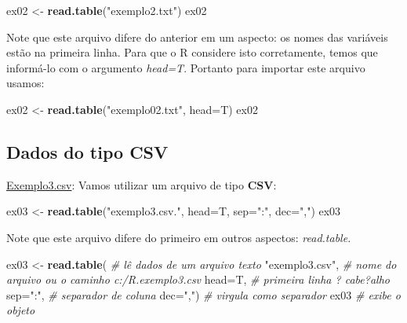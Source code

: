 \documentclass[
]{book}
\newenvironment{Shaded}{\begin{snugshade}}{\end{snugshade}}
\newcommand{\CommentTok}[1]{\textcolor[rgb]{0.56,0.35,0.01}{\textit{#1}}}
\newcommand{\DataTypeTok}[1]{\textcolor[rgb]{0.13,0.29,0.53}{#1}}
\newcommand{\KeywordTok}[1]{\textcolor[rgb]{0.13,0.29,0.53}{\textbf{#1}}}
\newcommand{\NormalTok}[1]{#1}
\newcommand{\StringTok}[1]{\textcolor[rgb]{0.31,0.60,0.02}{#1}}
\begin{document}
\begin{Shaded}
\begin{Highlighting}[]
\NormalTok{ex02 <-}\StringTok{ }\KeywordTok{read.table}\NormalTok{(}\StringTok{"exemplo2.txt"}\NormalTok{) }
\NormalTok{ex02}
\end{Highlighting}
\end{Shaded}

Note que este arquivo difere do anterior em um aspecto: os nomes das variáveis estão na primeira linha. Para que o R considere isto corretamente, temos que informá-lo com o argumento \emph{head=T}. Portanto para importar este arquivo usamos:

\begin{Shaded}
\begin{Highlighting}[]
\NormalTok{ex02 <-}\StringTok{ }\KeywordTok{read.table}\NormalTok{(}\StringTok{"exemplo02.txt"}\NormalTok{, }\DataTypeTok{head=}\NormalTok{T) }
\NormalTok{ex02}
\end{Highlighting}
\end{Shaded}

\hypertarget{dados-do-tipo-csv}{%
\subsection{Dados do tipo CSV}\label{dados-do-tipo-csv}}

\href{https://www.dropbox.com/s/mv13cmkysw2nizm/exemplo3.csv?dl=1}{Exemplo3.csv}: Vamos utilizar um arquivo de tipo \textbf{CSV}:

\begin{Shaded}
\begin{Highlighting}[]
\NormalTok{ex03 <-}\StringTok{ }\KeywordTok{read.table}\NormalTok{(}\StringTok{"exemplo3.csv."}\NormalTok{, }\DataTypeTok{head=}\NormalTok{T, }\DataTypeTok{sep=}\StringTok{":"}\NormalTok{, }\DataTypeTok{dec=}\StringTok{","}\NormalTok{) }
\NormalTok{ex03}
\end{Highlighting}
\end{Shaded}

Note que este arquivo difere do primeiro em outros aspectos:
\emph{read.table.}

\begin{Shaded}
\begin{Highlighting}[]
\NormalTok{ex03 <-}\StringTok{ }\KeywordTok{read.table}\NormalTok{(       }\CommentTok{# lê dados de um arquivo texto}
  \StringTok{"exemplo3.csv"}\NormalTok{,         }\CommentTok{# nome do arquivo ou o caminho c:/R.exemplo3.csv}
  \DataTypeTok{head=}\NormalTok{T,                 }\CommentTok{# primeira linha ? cabe?alho}
  \DataTypeTok{sep=}\StringTok{":"}\NormalTok{,                }\CommentTok{# separador de coluna }
  \DataTypeTok{dec=}\StringTok{","}\NormalTok{)                }\CommentTok{# virgula como separador}
\NormalTok{ex03                      }\CommentTok{# exibe o objeto}
\end{Highlighting}
\end{Shaded}
\end{document}
